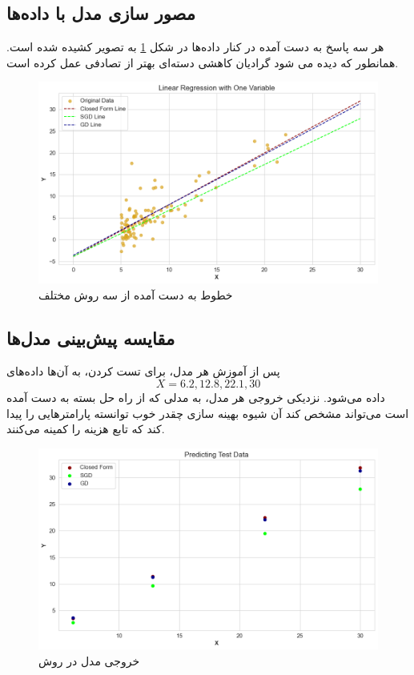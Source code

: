 \documentclass{article}
\begin{document}
	\subsection{مصور سازی مدل با داده‌ها}
	هر سه پاسخ به دست آمده در کنار داده‌ها در شکل 
	\ref{fig: model with data}
	 به تصویر کشیده شده است.‌ همانطور که دیده می شود گرادیان کاهشی دسته‌ای بهتر از تصادفی عمل کرده است.
	\begin{figure}[H]
	 	\centering
	 	\includegraphics[scale=0.5]{figs/model_with_data}
	 	\caption{خطوط به دست آمده از سه روش مختلف}
	 	\label{fig: model with data}
	\end{figure}
	 
	\subsection{مقایسه پیش‌بینی مدل‌ها}
	پس از آموزش هر مدل، برای تست کردن، به آن‌ها داده‌های 
	\[X = 6.2, 12.8, 22.1, 30\]
	داده می‌شود. نزدیکی خروجی هر مدل، به مدلی که از راه حل بسته به دست آمده است می‌تواند مشخص کند آن شیوه بهینه سازی چقدر خوب توانسته پارامترهایی را پیدا کند که تابع هزینه را کمینه می‌کنند.
	\begin{figure}[H]
		\centering
		\includegraphics[scale=0.5]{figs/prediction_one_var}
		\caption{خروجی مدل در روش}
		\label{fig: prediction one var}
	\end{figure}
	
\end{document}
